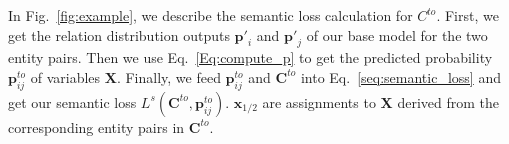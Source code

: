 In Fig.~\ref{fig:example},
we describe the semantic loss calculation for $C^{to}$.
First, we get the relation distribution outputs $\bm{p'}_i$ and $\bm{p'}_j$ of our base model for the two entity pairs.
Then we use Eq.~\ref{Eq:compute_p} to get the predicted probability $\bm{p}^{to}_{ij}$ of variables $\bm{X}$.
Finally, we feed $\bm{p}^{to}_{ij}$ and $\bm{C}^{to}$ into Eq.~\ref{seq:semantic_loss} and get our semantic loss $L^{s}(\bm{C}^{to}, \bm{p}^{to}_{ij})$.
$\bm{x}_{1/2}$ are assignments to $\bm{X}$ derived from the corresponding entity pairs in $\bm{C}^{to}$.
\iffalse



